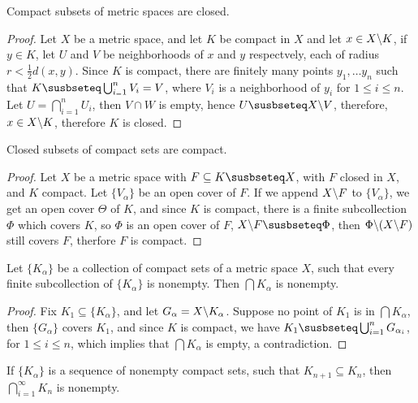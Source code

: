 \begin{theorem}\label{theorem_2.3.3}
  Compact subsets of metric spaces are closed.
\end{theorem}
\begin{proof}
  Let $X$ be a metric space, and let  $K$ be compact in  $X$ and let  $x \in
  X \backslash K$, if $y \in K$, let  $U$ and  $V$ be neighborhoods of  $x$ and $y$
  respectvely, each of radius  $r<\frac{1}{2}d(x,y)$. Since $K$ is compact, there
  are finitely many points $y_1, \dots y_n$ such that $K \susbseteq
  \bigcup_{i_=1}^{n}{V_i}=V$, where $V_i$ is a neighborhood of  $y_i$ for
  $1 \leq i \leq n$. Let  $U=\bigcap_{i=1}^{n}{U_i}$, then $V \cap W$ is empty,
  hence  $U \susbseteq \com{X}{V}$, therefore,  $x \in X \backslash K$, therefore $K$
  is closed.
\end{proof}

\begin{theorem}\label{theorem_2.3.4}
  Closed subsets of compact sets are compact.
\end{theorem}
\begin{proof}
  Let $X$ be a metric space with  $F \subseteq K \susbseteq X$, with  $F$ closed in
  $X$, and $K$ compact. Let  $\{V_{\alpha}\}$ be an open cover of  $F$. If we append
  $X \backslash F$ to  $\{V_{\alpha}\}$, we get an open cover  $\Theta$ of  $K$, and
  since $K$ is compact, there is a finite subcollection  $\Phi$ which covers  $K$,
  so  $\Phi$ is an open cover of $F$, $\com{X}{F} \susbseteq \Phi$, then
  $\Phi \backslash (X \backslash F)$ still covers  $F$, therfore  $F$ is compact.
\end{proof}

\begin{theorem}\label{theorem_2.3.5}
  Let $\{K_{\alpha}\}$ be a collection of compact sets of a metric space  $X$,
  such that every finite subcollection of  $\{K_{\alpha}\}$ is nonempty. Then
  $\bigcap{K_{\alpha}}$ is nonempty.
\end{theorem}
\begin{proof}
  Fix $K_1 \subseteq \{K_{\alpha}\}$, and let $G_{\alpha}=X \backslash K_{\alpha}$.
  Suppose no point of  $K_1$ is in $\bigcap{K_{\alpha}}$, then  $\{G_{\alpha}\}$
  covers  $K_1$, and since $K$ is compact, we have  $K_1 \susbseteq
  \bigcup_{i=1}^{n}{G_{\alpha_i}}$, for  $1 \leq i \leq n$, which implies that
  $\bigcap{K_{\alpha}}$ is empty, a contradiction.
\end{proof}

\begin{corollary}
  If $\{K_{\alpha}\}$ is a sequence of nonempty compact sets, such that  $K_{n+1}
  \subseteq K_n$, then  $\bigcap_{i=1}^{\infty}{K_n}$ is nonempty.
\end{corollary}

